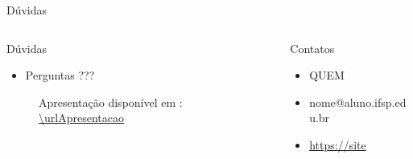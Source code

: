 \documentclass[%
    english,
    brazil]{ifsp-spo-beamer}
\begin{document}
\begin{frame}{Dúvidas} 





    \begin{columns}[t]
    
        \begin{column}{0.45\textwidth}
            \begin{block}{Dúvidas}
                \begin{itemize}
                  \item Perguntas ???
                \end{itemize}

                \begin{figure}
                    \centering
                    \qrcode{\urlApresentacao}
                    \caption*{Apresentação disponível em : \newline \url{\urlApresentacao}}
                \end{figure}

            \end{block}
        \end{column}
    
        \begin{column}{0.45\textwidth}
            \begin{block}{Contatos}
                \begin{itemize}
                  \item QUEM
                  \item nome@aluno.ifsp.edu.br
                  \item \url{https://site}
                \end{itemize}
    
                \begin{figure}
                    \centering
                \end{figure}
            \end{block}
        \end{column}
    \end{columns}




\end{frame}
\end{document}
